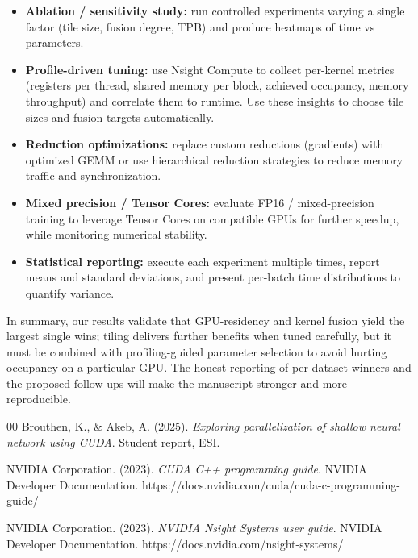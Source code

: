 \documentclass[conference, 12pt]{IEEEtran}
\begin{document}
\begin{itemize}
  \item \textbf{Ablation / sensitivity study:} run controlled experiments varying a single factor (tile size, fusion degree, TPB) and produce heatmaps of time vs parameters.
  \item \textbf{Profile-driven tuning:} use Nsight Compute to collect per-kernel metrics (registers per thread, shared memory per block, achieved occupancy, memory throughput) and correlate them to runtime. Use these insights to choose tile sizes and fusion targets automatically.
  \item \textbf{Reduction optimizations:} replace custom reductions (gradients) with optimized GEMM or use hierarchical reduction strategies to reduce memory traffic and synchronization.
  \item \textbf{Mixed precision / Tensor Cores:} evaluate FP16 / mixed-precision training to leverage Tensor Cores on compatible GPUs for further speedup, while monitoring numerical stability.
  \item \textbf{Statistical reporting:} execute each experiment multiple times, report means and standard deviations, and present per-batch time distributions to quantify variance.
\end{itemize}

In summary, our results validate that GPU-residency and kernel fusion yield the largest single wins; tiling delivers further benefits when tuned carefully, but it must be combined with profiling-guided parameter selection to avoid hurting occupancy on a particular GPU. The honest reporting of per-dataset winners and the proposed follow-ups will make the manuscript stronger and more reproducible.




\begin{thebibliography}{00}
Brouthen, K., \& Akeb, A. (2025). 
\emph{Exploring parallelization of shallow neural network using CUDA}. 
Student report, ESI.

NVIDIA Corporation. (2023). 
\emph{CUDA C++ programming guide}. 
NVIDIA Developer Documentation. 
https://docs.nvidia.com/cuda/cuda-c-programming-guide/

NVIDIA Corporation. (2023). 
\emph{NVIDIA Nsight Systems user guide}. 
NVIDIA Developer Documentation. 
https://docs.nvidia.com/nsight-systems/

\end{thebibliography}
\end{document}
